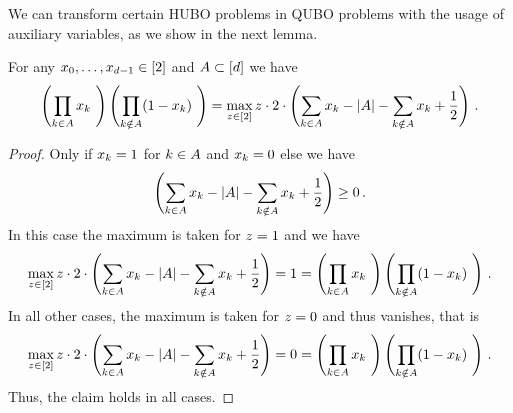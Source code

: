 

We can transform certain HUBO problems in QUBO problems with the usage of auxiliary variables, as we show in the next lemma.

\begin{lemma}\label{lem:monomialToQUBO}
	For any ${x_{0},\ldots,x_{d-1}}\in[2]$ and $A\subset[d]$ we have 
		\[ \left( \prod_{\atomenumerator\in\variableset} \atomlegindexof{\atomenumerator } \right)  \left(  \prod_{\atomenumerator\notin\variableset} (1- \atomlegindexof{\atomenumerator }) \right)
		=
		\max_{\slackvariable\in[2]} \slackvariable \cdot 2 \cdot \left( \sum_{\atomenumerator\in\variableset}\atomlegindexof{\atomenumerator}  - \cardof{\variableset} - \sum_{\atomenumerator\notin\variableset}\atomlegindexof{\atomenumerator} + \frac{1}{2} \right) \, . %
 		\]
\end{lemma}
\begin{proof} %
	Only if $x_{k}=1$ for $k\in A$ and $x_{k}=0$ else we have
		\[ \left( \sum_{k\in A}x_{k}  - \left|A\right| - \sum_{k\notin A}x_{k} + \frac{1}{2} \right) \geq 0 \, . \]
	In this case the maximum is taken for $z=1$ and we have
		\[ \max_{\slackvariable\in[2]} \slackvariable \cdot 2 \cdot \left( \sum_{\atomenumerator\in\variableset}\atomlegindexof{\atomenumerator}  - \cardof{\variableset} - \sum_{\atomenumerator\notin\variableset}\atomlegindexof{\atomenumerator} + \frac{1}{2} \right) 
		= 1 = \left( \prod_{\atomenumerator\in\variableset} \atomlegindexof{\atomenumerator } \right)  \left(  \prod_{\atomenumerator\notin\variableset} (1- \atomlegindexof{\atomenumerator }) \right) \, . \]
	In all other cases, the maximum is taken for $z=0$ and thus vanishes, that is 
		\[ \max_{\slackvariable\in[2]} \slackvariable \cdot 2 \cdot \left( \sum_{\atomenumerator\in\variableset}\atomlegindexof{\atomenumerator}  - \cardof{\variableset} - \sum_{\atomenumerator\notin\variableset}\atomlegindexof{\atomenumerator} + \frac{1}{2} \right) 
		= 0 = \left( \prod_{\atomenumerator\in\variableset} \atomlegindexof{\atomenumerator } \right)  \left(  \prod_{\atomenumerator\notin\variableset} (1- \atomlegindexof{\atomenumerator }) \right) \, . \]
	Thus, the claim holds in all cases.
\end{proof}	


